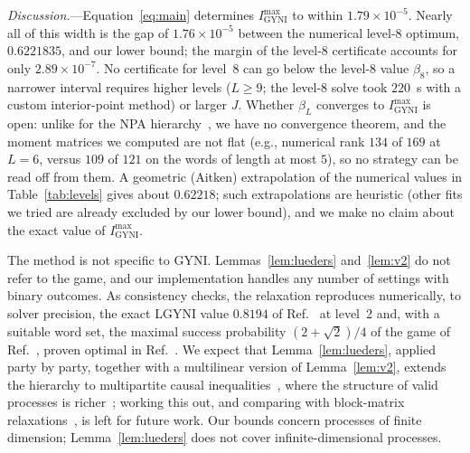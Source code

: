 \documentclass[aps,prl,twocolumn,superscriptaddress,longbibliography,nofootinbib]{revtex4-2}
\newcommand{\Imax}{I_{\mathrm{GYNI}}^{\max}}
\begin{document}
\emph{Discussion.}---Equation~\eqref{eq:main} determines $\Imax$ to within $1.79\times10^{-5}$. Nearly all of this width is the gap of $1.76\times10^{-5}$ between the numerical level-8 optimum, $0.6221835$, and our lower bound; the margin of the level-8 certificate accounts for only $2.89\times10^{-7}$. No certificate for level~8 can go below the level-8 value $\beta_8$, so a narrower interval requires higher levels ($L\ge9$; the level-8 solve took $220$~s with a custom interior-point method) or larger $J$. Whether $\beta_L$ converges to $\Imax$ is open: unlike for the NPA hierarchy~\cite{NPA2008}, we have no convergence theorem, and the moment matrices we computed are not flat (e.g., numerical rank $134$ of $169$ at $L=6$, versus $109$ of $121$ on the words of length at most $5$), so no strategy can be read off from them. A geometric (Aitken) extrapolation of the numerical values in Table~\ref{tab:levels} gives about $0.62218$; such extrapolations are heuristic (other fits we tried are already excluded by our lower bound), and we make no claim about the exact value of $\Imax$.

The method is not specific to GYNI. Lemmas~\ref{lem:lueders} and~\ref{lem:v2} do not refer to the game, and our implementation handles any number of settings with binary outcomes. As consistency checks, the relaxation reproduces numerically, to solver precision, the exact LGYNI value $0.8194$ of Ref.~\cite{LiuChiribella2025} at level~2 and, with a suitable word set, the maximal success probability $(2+\sqrt2)/4$ of the game of Ref.~\cite{Oreshkov2012}, proven optimal in Ref.~\cite{LiuChiribella2025}. We expect that Lemma~\ref{lem:lueders}, applied party by party, together with a multilinear version of Lemma~\ref{lem:v2}, extends the hierarchy to multipartite causal inequalities~\cite{BaumelerWolf2014,Abbott2016}, where the structure of valid processes is richer~\cite{Araujo2015,OreshkovGiarmatzi2016}; working this out, and comparing with block-matrix relaxations~\cite{DAlessandro2026}, is left for future work. Our bounds concern processes of finite dimension; Lemma~\ref{lem:lueders} does not cover infinite-dimensional processes.
\end{document}
